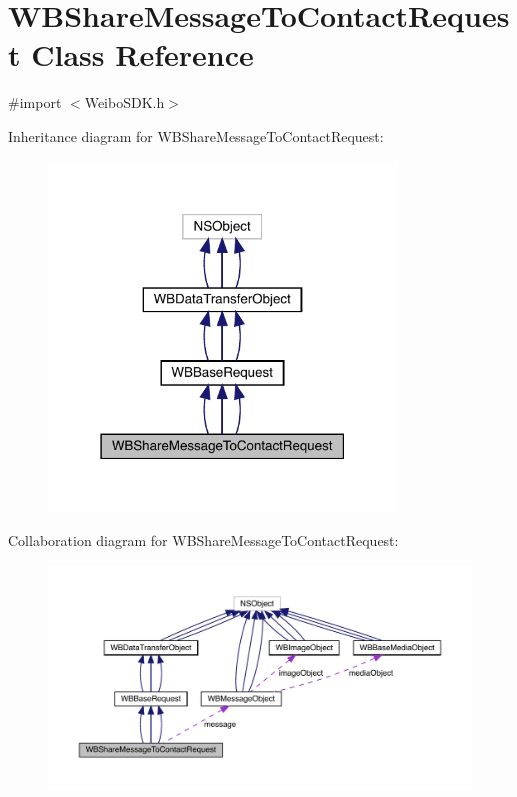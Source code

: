 \hypertarget{interface_w_b_share_message_to_contact_request}{}\section{W\+B\+Share\+Message\+To\+Contact\+Request Class Reference}
\label{interface_w_b_share_message_to_contact_request}


{\ttfamily \#import $<$Weibo\+S\+D\+K.\+h$>$}



Inheritance diagram for W\+B\+Share\+Message\+To\+Contact\+Request\+:\nopagebreak
\begin{figure}[H]
\begin{center}
\leavevmode
\includegraphics[width=262pt]{interface_w_b_share_message_to_contact_request__inherit__graph}
\end{center}
\end{figure}


Collaboration diagram for W\+B\+Share\+Message\+To\+Contact\+Request\+:\nopagebreak
\begin{figure}[H]
\begin{center}
\leavevmode
\includegraphics[width=350pt]{interface_w_b_share_message_to_contact_request__coll__graph}
\end{center}
\end{figure}
